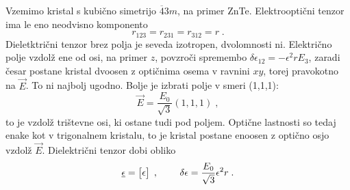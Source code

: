 Vzemimo kristal s kubično simetrijo $\overline{4}3m$, na primer ZnTe.
Elektrooptični tenzor ima le eno neodvisno komponento 
\begin{equation}
r_{123}=r_{231}=r_{312}=r\;.\label{7.6}
\end{equation}
 Dieletktrični tenzor brez polja je seveda izotropen, dvolomnosti
ni. Električno polje vzdolž ene od osi, na primer $z$, povzroči spremembo
$\delta\epsilon_{12}=-\epsilon^{2}rE_{3}$, zaradi česar postane kristal
dvoosen z optičnima osema v ravnini $xy$, torej pravokotno na $\vec{E}$.
To ni najbolj ugodno. Bolje je izbrati polje v smeri (1,1,1): 
\begin{equation}
\vec{E}=\frac{E_{0}}{\sqrt{3}}(1,1,1)\;,\label{7.7}
\end{equation}
 to je vzdolž trištevne osi, ki ostane tudi pod poljem. Optične lastnosti
so tedaj enake kot v trigonalnem kristalu, to je kristal postane enoosen
z optično osjo vzdolž $\vec{E}$. Dielektrični tenzor dobi obliko
\begin{equation}
\underline{\epsilon}=\left[\begin{matrix}\epsilon\end{matrix}\right]\;,\hskip0.8cm\delta\epsilon=\frac{E_{0}}{\sqrt{3}}\epsilon^{2}r\;.\label{7.8}
\end{equation}


